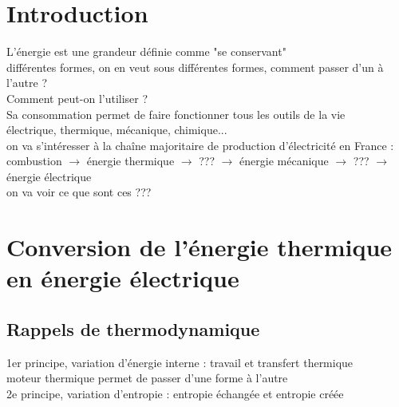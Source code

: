 


\biblio{}

\section*{Introduction}
L'énergie est une grandeur définie comme "se conservant" \\
différentes formes, on en veut sous différentes formes, comment passer d'un à l'autre ? \\ 
Comment peut-on l'utiliser ?  \\
Sa consommation permet de faire fonctionner tous les outils de la vie \\
électrique, thermique, mécanique, chimique... \\
 on va s'intéresser à la chaîne majoritaire de production d'électricité en France : combustion $\rightarrow$ énergie thermique $\rightarrow$ ???  $\rightarrow$ énergie mécanique $\rightarrow$  ???  $\rightarrow$ énergie électrique \\
 on va voir ce que sont ces ???

\section{Conversion de l'énergie thermique en énergie électrique}
\subsection{Rappels de thermodynamique}
1er principe, variation d'énergie interne : travail et transfert thermique \\
moteur thermique permet de passer d'une forme à l'autre \\
2e principe, variation d'entropie : entropie échangée et entropie créée \\

